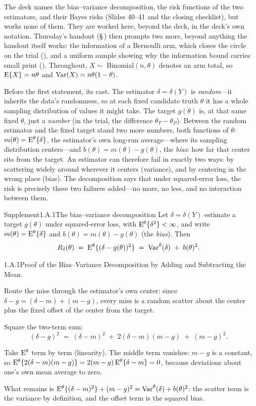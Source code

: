 \documentclass[main.tex]{subfiles}
\begin{document}
The deck names the bias--variance decomposition, the risk functions of the two estimators, and
their Bayes risks (Slides 40--41 and the closing checklist), but works none of them. They are
worked here, beyond the deck, in the deck's own notation. Thursday's handout
(\S\,) then prompts two more, beyond anything the handout itself works: the
information of a Bernoulli arm, which closes the circle on the trial (), and a
uniform sample showing why the information bound carries small print (). Throughout, $X\sim$
Binomial$(n,\theta)$ denotes an arm total, so $\mathrm{E}\{X\}=n\theta$ and
$\operatorname{Var}(X)=n\theta(1-\theta)$.

\medskip
Before the first statement, its cast. The estimator $\delta=\delta(Y)$ is \emph{random}---it
inherits the data's randomness, so at each fixed candidate truth $\theta$ it has a whole
sampling distribution of values it might take. The target $g(\theta)$ is, at that same fixed
$\theta$, just a \emph{number} (in the trial, the difference $\theta_T-\theta_P$). Between the
random estimator and the fixed target stand two more numbers, both functions of $\theta$:
$m(\theta)=\mathrm{E}^{\theta}\{\delta\}$, the estimator's own long-run average---where its sampling
distribution centers---and $b(\theta)=m(\theta)-g(\theta)$, the \emph{bias}: how far that
center sits from the target. An estimator can therefore fail in exactly two ways: by
scattering widely around wherever it centers (variance), and by centering in the wrong place
(bias). The decomposition says that under squared-error loss, the risk is precisely these two
failures added---no more, no less, and no interaction between them.

\begin{ObjL}{Supplement}{1.A.1}{The bias--variance decomposition}
Let $\delta=\delta(Y)$ estimate a target $g(\theta)$ under squared-error loss, with
$\mathrm{E}^{\theta}\{\delta^2\}<\infty$, and write
$m(\theta)=\mathrm{E}^{\theta}\{\delta\}$ and $b(\theta)=m(\theta)-g(\theta)$ (the \emph{bias}). Then
\[ R_{\delta}(\theta) \;=\; \mathrm{E}^{\theta}\{(\delta-g(\theta))^2\}
   \;=\; \operatorname{Var}^{\theta}(\delta) \;+\; b(\theta)^2 . \]
\end{ObjL}
\begin{Prf}{1.A.1}{Proof of the Bias--Variance Decomposition by Adding and Subtracting the Mean.}{}
\item Route the miss through the estimator's own center: since
      $\delta-g=(\delta-m)+(m-g)$, every miss is a random scatter about the center plus the
      fixed offset of the center from the target.
\item Square the two-term sum:
      \[ (\delta-g)^2 \;=\; (\delta-m)^2 \;+\; 2(\delta-m)(m-g) \;+\; (m-g)^2 . \]
\item Take $\mathrm{E}^{\theta}$ term by term (linearity). The middle term vanishes:
      $m-g$ is a constant, so
      $\mathrm{E}^{\theta}\{2(\delta-m)(m-g)\}=2(m-g)\,\mathrm{E}^{\theta}\{\delta-m\}=0$, because deviations
      about one's own mean average to zero.
\item What remains is
      $\mathrm{E}^{\theta}\{(\delta-m)^2\}+(m-g)^2=\operatorname{Var}^{\theta}(\delta)+b(\theta)^2$: the scatter
      term is the variance by definition, and the offset term is the squared bias.
\end{Prf}
\end{document}
